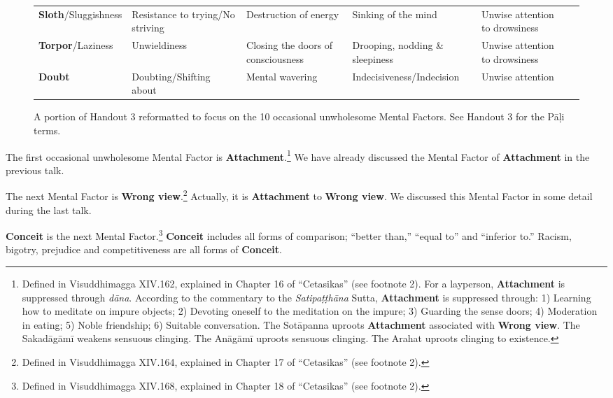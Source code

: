 \begin{figure} [H]
\begin{tabular}{P{0.25\textwidth} | C{.185\textwidth} C{0.185\textwidth} C{0.185\textwidth} C{0.195\textwidth} m{0mm}}
\textbf{Sloth}/\newline Sluggishness & Resistance to trying/\newline No striving & Destruction of energy & Sinking of the mind & Unwise attention to drowsiness &\\[9mm]
\textbf{Torpor}/\newline Laziness & Unwieldiness & Closing the doors of consciousness & Drooping, nodding \& sleepiness & Unwise attention to drowsiness &\\[9mm]
\textbf{Doubt} & Doubting/\newline Shifting about & Mental wavering & Indecisiveness/\newline Indecision & Unwise attention &\\[9mm]
\bottomrule
\end{tabular}

\caption{A portion of Handout 3 reformatted to focus on the 10 occasional unwholesome Mental Factors. See Handout 3 for the Pāḷi terms.}

\end{figure}

The first occasional unwholesome Mental Factor is \textbf{Attachment}.\footnote{Defined in Visuddhimagga XIV.162, explained in Chapter 16 of “Cetasikas” (see footnote 2). For a layperson, \textbf{Attachment} is suppressed through \textit{dāna}. According to the commentary to the \textit{Satipaṭṭhāna} Sutta, \textbf{Attachment} is suppressed through: 1) Learning how to meditate on impure objects; 2) Devoting oneself to the meditation on the impure; 3) Guarding the sense doors; 4) Moderation in eating; 5) Noble friendship; 6) Suitable conversation. The Sotāpanna uproots \textbf{Attachment} associated with \textbf{Wrong view}. The Sakadāgāmī weakens sensuous clinging. The Anāgāmī uproots sensuous clinging. The Arahat uproots clinging to existence.
} We have already discussed the Mental Factor of \textbf{Attachment} in the previous talk.

The next Mental Factor is \textbf{Wrong view}.\footnote{Defined in Visuddhimagga XIV.164, explained in Chapter 17 of “Cetasikas” (see footnote 2).} Actually, it is \textbf{Attachment} to \textbf{Wrong view}. We discussed this Mental Factor in some detail during the last talk.

\textbf{Conceit} is the next Mental Factor.\footnote{Defined in Visuddhimagga XIV.168, explained in Chapter 18 of “Cetasikas” (see footnote 2).} \textbf{Conceit} includes all forms of comparison; “better than,” “equal to” and “inferior to.” Racism, bigotry, prejudice and competitiveness are all forms of \textbf{Conceit}.

